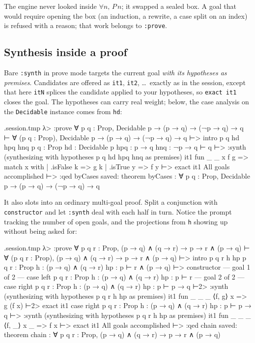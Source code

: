 \documentclass[11pt,oneside]{article}
\newcommand{\code}[1]{\texttt{#1}}
\newenvironment{session}
 {\VerbatimEnvironment\begin{VerbatimOut}{\jobname.session.tmp}}
 {\end{VerbatimOut}%
  \begin{sessionouter}%
  \VerbatimInput[fontsize=\footnotesize, breaklines=true,
    breaksymbolleft={\textcolor{stone}{\footnotesize$\hookrightarrow$}},
    formatcom=\color{ink}, tabsize=4]{\jobname.session.tmp}%
  \end{sessionouter}}
\begin{document}
The engine never looked inside $\forall n,\, P\,n$; it swapped a
sealed box. A goal that would require opening the box (an induction, a
rewrite, a case split on an index) is refused with a reason; that work
belongs to \code{:prove}.

\subsection{Synthesis inside a proof}\label{sec:synthprove}

Bare \code{:synth} in prove mode targets the current goal \emph{with
its hypotheses as premises}. Candidates are offered as \code{it1},
\code{it2}, \dots\ exactly as in the session, except that here
\code{itN} splices the candidate applied to your hypotheses, so
\code{exact it1} closes the goal. The hypotheses can carry real
weight; below, the case analysis on the \code{Decidable} instance
comes from \code{hd}:

\begin{session}
λ> :prove ∀ p q : Prop, Decidable p → (p → q) → (¬p → q) → q
⊢ ∀ (p q : Prop), Decidable p → (p → q) → (¬p → q) → q
⊢> intro p q hd hpq hnq
p q : Prop
hd : Decidable p
hpq : p → q
hnq : ¬p → q
⊢ q
⊢> :synth
(synthesizing with hypotheses p q hd hpq hnq as premises)
  it1  fun _ _ x f g => match x with | .isFalse k => g k | .isTrue y => f y
⊢> exact it1
All goals accomplished
⊢> :qed byCases
saved: theorem byCases : ∀ p q : Prop, Decidable p → (p → q) → (¬p → q) → q
\end{session}

It also slots into an ordinary multi-goal proof. Split a conjunction
with \code{constructor} and let \code{:synth} deal with each half in
turn. Notice the prompt tracking the number of open goals, and the
projections from \code{h} showing up without being asked for:

\begin{session}
λ> :prove ∀ p q r : Prop, (p → q) ∧ (q → r) → p → r ∧ (p → q)
⊢ ∀ (p q r : Prop), (p → q) ∧ (q → r) → p → r ∧ (p → q)
⊢> intro p q r h hp
p q r : Prop
h : (p → q) ∧ (q → r)
hp : p
⊢ r ∧ (p → q)
⊢> constructor
— goal 1 of 2 —
case left
p q r : Prop
h : (p → q) ∧ (q → r)
hp : p
⊢ r
— goal 2 of 2 —
case right
p q r : Prop
h : (p → q) ∧ (q → r)
hp : p
⊢ p → q
⊢2> :synth
(synthesizing with hypotheses p q r h hp as premises)
  it1  fun _ _ _ ⟨f, g⟩ x => g (f x)
⊢2> exact it1
case right
p q r : Prop
h : (p → q) ∧ (q → r)
hp : p
⊢ p → q
⊢> :synth
(synthesizing with hypotheses p q r h hp as premises)
  it1  fun _ _ _ ⟨f, _⟩ x _ => f x
⊢> exact it1
All goals accomplished
⊢> :qed chain
saved: theorem chain : ∀ p q r : Prop, (p → q) ∧ (q → r) → p → r ∧ (p → q)
\end{session}
\end{document}
